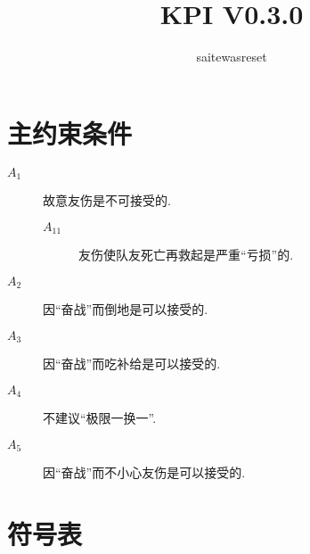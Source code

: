 \documentclass{ctexart}
\begin{document}
\title{KPI V0.3.0}
\author{saitewasreset}

\maketitle

\tableofcontents

\section{主约束条件}

\begin{description}
    \item[$A_1$] 故意友伤是不可接受的.
          \begin{description}
              \item[$A_{11}$] 友伤使队友死亡再救起是严重“亏损”的.
          \end{description}
    \item[$A_2$] 因“奋战”而倒地是可以接受的.
    \item[$A_3$] 因“奋战”而吃补给是可以接受的.
    \item[$A_4$] 不建议“极限一换一”.
    \item[$A_5$] 因“奋战”而不小心友伤是可以接受的.
\end{description}

\section{符号表}
\end{document}
